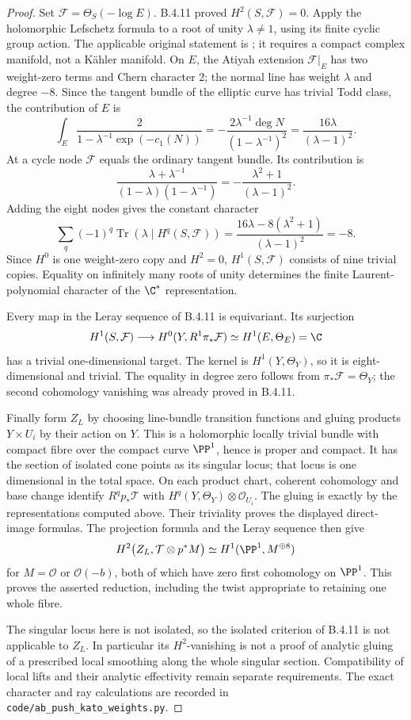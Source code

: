 \begin{proof}
Set $\mathcal F=\Theta_S(-\log E)$.
B.4.11 proved $H^2(S,\mathcal F)=0$.
Apply the holomorphic Lefschetz formula to a root of unity
$\lambda\ne1$, using its finite cyclic group action.
The applicable original statement is
\citet[Theorem~(4.6), p.~566]{AtiyahSinger1968IIIE}; it requires
a compact complex manifold, not a K\"ahler manifold.
On $E$, the Atiyah extension $\mathcal F|_E$ has two
weight-zero terms and Chern character $2$; the normal line
has weight $\lambda$ and degree $-8$.
Since the tangent bundle of the elliptic curve has trivial
Todd class, the contribution of $E$ is
\[
 \int_E\frac{2}{1-\lambda^{-1}\exp(-c_1(N))}
   =-\frac{2\lambda^{-1}\deg N}
           {(1-\lambda^{-1})^2}
   =\frac{16\lambda}{(\lambda-1)^2}.
\]
At a cycle node $\mathcal F$ equals the ordinary tangent
bundle.  Its contribution is
\[
 \frac{\lambda+\lambda^{-1}}
      {(1-\lambda)(1-\lambda^{-1})}
   =-\frac{\lambda^2+1}{(\lambda-1)^2}.
\]
Adding the eight nodes gives the constant character
\[
 \sum_q(-1)^q\operatorname{Tr}
       (\lambda\mid H^q(S,\mathcal F))
 =\frac{16\lambda-8(\lambda^2+1)}{(\lambda-1)^2}
 =-8.
\]
Since $H^0$ is one weight-zero copy and $H^2=0$,
$H^1(S,\mathcal F)$ consists of nine trivial copies.
Equality on infinitely many roots of unity determines the
finite Laurent-polynomial character of the $\C^*$ representation.

Every map in the Leray sequence of B.4.11 is equivariant.
Its surjection
\[
 H^1(S,\mathcal F)\longrightarrow
 H^0(Y,R^1\pi_*\mathcal F)
       \simeq H^1(E,\Theta_E)=\C
\]
has a trivial one-dimensional target.
The kernel is $H^1(Y,\Theta_Y)$, so it is eight-dimensional
and trivial.  The equality in degree zero follows from
$\pi_*\mathcal F=\Theta_Y$; the second cohomology vanishing
was already proved in B.4.11.

Finally form $Z_L$ by choosing line-bundle transition functions
and gluing products $Y\times U_i$ by their action on $Y$.
This is a holomorphic locally trivial bundle with compact
fibre over the compact curve $\PP^1$, hence is proper and
compact.  It has the section of isolated cone points as its
singular locus; that locus is one dimensional in the total
space.  On each product chart, coherent cohomology and base
change identify $R^qp_*\mathcal T$ with
$H^q(Y,\Theta_Y)\otimes\mathcal O_{U_i}$.
The gluing is exactly by the representations computed above.
Their triviality proves the displayed direct-image formulas.
The projection formula and the Leray sequence then give
\[
 H^2\bigl(Z_L,\mathcal T\otimes p^*M\bigr)
      \simeq H^1(\PP^1,M^{\oplus8})
\]
for $M=\mathcal O$ or $\mathcal O(-b)$, both of which have
zero first cohomology on $\PP^1$.
This proves the asserted reduction, including the twist
appropriate to retaining one whole fibre.

The singular locus here is not isolated, so the isolated
criterion of B.4.11 is not applicable to $Z_L$.
In particular its $H^2$-vanishing is not a proof of analytic
gluing of a prescribed local smoothing along the whole
singular section.  Compatibility of local lifts and their
analytic effectivity remain separate requirements.
The exact character and ray calculations are recorded in
\texttt{code/ab\_push\_kato\_weights.py}.
\end{proof}


